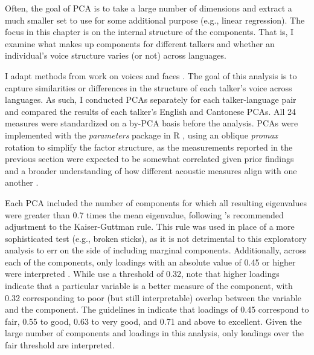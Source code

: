 Often, the goal of PCA is to take a large number of dimensions and extract a much smaller set to use for some additional purpose (e.g., linear regression). The focus in this chapter is on the internal structure of the components. That is, I examine what makes up components for different talkers and whether an individual's voice structure varies (or not) across languages.  

I adapt methods from work on voices \citep{lee_2019_acoustic, lee_2020_language} and faces \citep{burton_2016_faces, turk_1991_eigenfaces}. The goal of this analysis is to capture similarities or differences in the structure of each talker's voice across languages. As such, I conducted PCAs separately for each talker-language pair and compared the results of each talker's English and Cantonese PCAs. All 24 measures were standardized on a by-PCA basis before the analysis. PCAs were implemented with the \textit{parameters} package \citep{makowski_2019_parameters} in R \citep{r_2021}, using an oblique \textit{promax} rotation to simplify the factor structure, as the measurements reported in the previous section were expected to be somewhat correlated given prior findings \citep{lee_2019_acoustic} and a broader understanding of how different acoustic measures align with one another \citep{kreiman_2014_theory, kreiman_2021_validating}.

Each PCA included the number of components for which all resulting eigenvalues were greater than 0.7 times the mean eigenvalue, following \citeauthor{jolliffe_2002_pca}'s \citeyearpar{jolliffe_2002_pca} recommended adjustment to the Kaiser-Guttman rule. This rule was used in place of a more sophisticated test (e.g., broken sticks), as it is not detrimental to this exploratory analysis to err on the side of including marginal components. Additionally, across each of the components, only loadings with an absolute value of 0.45 or higher were interpreted \citep{lee_2019_acoustic, tabachnick_2013_statistics}. While \citet{lee_2019_acoustic} use a threshold of 0.32, \citet{tabachnick_2013_statistics} note that higher loadings indicate that a particular variable is a better measure of the component, with 0.32 corresponding to poor (but still interpretable) overlap between the variable and the component. The guidelines in \citet{tabachnick_2013_statistics} indicate that loadings of 0.45 correspond to fair, 0.55 to good, 0.63 to very good, and 0.71 and above to excellent. Given the large number of components and loadings in this analysis, only loadings over the fair threshold are interpreted.

